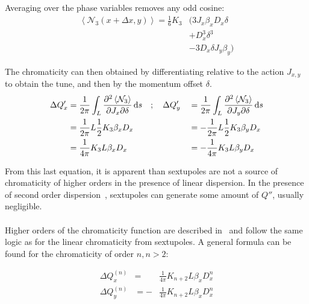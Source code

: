 Averaging over the phase variables removes any odd cosine:
\begin{equation}\begin{aligned}
  \left< \mathcal{N}_3(x + \Delta x, y) \right> = \frac{1}{6} K_3 &\biggl(
       3 J_x \beta_x D_x \delta \\
  &    + D_x^3 \delta^3 \\
  &    - 3 D_x \delta J_y \beta_y \biggl)
\end{aligned}\end{equation}



The chromaticity can then obtained by differentiating relative to the action $J_{x,y}$ to obtain the
tune, and then by the momentum offset $\delta$.
\begin{equation}
    \begin{aligned}
        \Delta Q'_x &= \frac{1}{2\pi} \int_L \frac{\partial^2 \left< \mathcal{N}_3 \right>}{\partial J_x \partial \delta} \mathop{}\!\mathrm{d} s \quad; \quad \Delta Q'_y &&= \frac{1}{2\pi} \int_L \frac{\partial^2 \left< \mathcal{N}_3 \right>}{\partial J_y \partial \delta} \mathop{}\!\mathrm{d} s \\
        &= \frac{1}{2 \pi} L \frac{1}{2} K_3 \beta_x D_x  &&= - \frac{1}{2 \pi} L \frac{1}{2} K_3 \beta_y D_x \\
        &= \frac{1}{4 \pi}  K_3 L \beta_x D_x &&= - \frac{1}{4 \pi}  K_3 L \beta_y D_x
    \end{aligned}
\end{equation}

From this last equation, it is apparent than sextupoles are not a source of chromaticity of higher
orders in the presence of linear dispersion. In the presence of second order
dispersion~\cite{keintzel_second-order_2019}, sextupoles can generate some amount of $Q''$, usually
negligible.


\paragraph{}

Higher orders of the chromaticity function are described in~\cite{dilly_derivation_2023} and follow
the same logic as for the linear chromaticity from sextupoles.
A general formula can be found for the chromaticity of order $n, n > 2$:

\begin{equation}
    \begin{aligned}
        \Delta Q_x^{(n)} &= &\frac{1}{4\pi} K_{n+2} L \beta_x D_x^{n}\\
        \Delta Q_y^{(n)} &= -&\frac{1}{4\pi} K_{n+2} L \beta_x D_x^{n}\\
    \end{aligned}
    \label{eq:detuning_effects:chromaticity_strength}
\end{equation}




